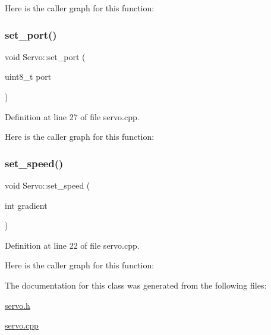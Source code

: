 Here is the caller graph for this function\+:
\mbox{\label{class_servo_a9986e323bf68602b56654a4eb44c683c}} 
\subsubsection{\texorpdfstring{set\+\_\+port()}{set\_port()}}
{\footnotesize\ttfamily void Servo\+::set\+\_\+port (\begin{DoxyParamCaption}\item[{uint8\+\_\+t}]{port }\end{DoxyParamCaption})}



Definition at line 27 of file servo.\+cpp.

Here is the caller graph for this function\+:
\mbox{\label{class_servo_aecca91f485fc36404ce8cdfcb95f0527}} 
\subsubsection{\texorpdfstring{set\+\_\+speed()}{set\_speed()}}
{\footnotesize\ttfamily void Servo\+::set\+\_\+speed (\begin{DoxyParamCaption}\item[{int}]{gradient }\end{DoxyParamCaption})}



Definition at line 22 of file servo.\+cpp.

Here is the caller graph for this function\+:


The documentation for this class was generated from the following files\+:\begin{DoxyCompactItemize}
\item 
\mbox{\hyperlink{servo_8h}{servo.\+h}}\item 
\mbox{\hyperlink{servo_8cpp}{servo.\+cpp}}\end{DoxyCompactItemize}
